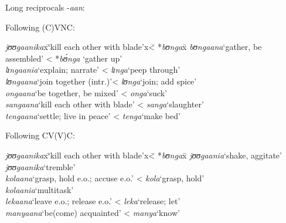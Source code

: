 \begin{exe}
	\ex \label{exReciprocalLong}
	Long reciprocals -\textit{aan}:
	\begin{xlist}
		\ex Following (C)VNC:
		\begin{tabbing}
			\textit{jʊʊgaanika}x\=\lq kill each other with blade'x\= < *\textit{bʊnga}x\=\kill%
			\textit{bʊngaana}\>`gather, be assembled'\> < *\textit{bʊ́nga} `gather up'\\
			\textit{lɪngaania}\>\lq explain; narrate'\> < \textit{lɪnga}\>`peep through'\\
			\textit{lʊngaana}\>`join together (intr.)'\>< \textit{lʊnga}\>`join; add spice'\\
			\textit{ongaana}\>`be together, be mixed'\> < \textit{onga}\>`suck'\\
			\textit{sangaana}\>\lq kill each other with blade'\> < \textit{sanga}\>\lq slaughter'\\
			\textit{tengaana}\>\lq settle; live in peace'\> < \textit{tenga}\>`make bed'
		\end{tabbing}
		\ex Following CV(V)C:
		\begin{tabbing}
			\textit{jʊʊgaanika}x\=\lq kill each other with blade'x\= < *\textit{bʊnga}x\=\kill%
			\textit{jʊʊgaania}\>`shake, aggitate'\\
			\textit{jʊʊgaanika}\>`tremble'\\
			\textit{kolaana}\>`grasp, hold e.o.; accuse e.o.'\> < \textit{kola}\>\lq grasp, hold' \\
			\textit{kolaania}\>`multitask'\\
			\textit{lekaana}\>`leave e.o.; release e.o.'\> < \textit{leka}\>\lq release; let'\\
			\textit{manyaana}\>`be(come) acquainted'\> < \textit{manya}\>`know'
		\end{tabbing}
	\end{xlist}
\end{exe}


